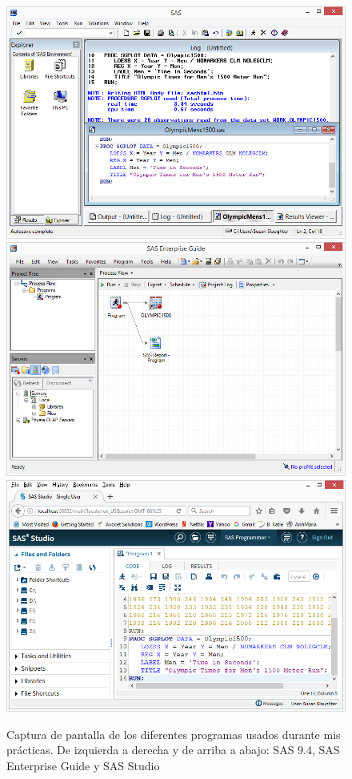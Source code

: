\documentclass[pdftex,11pt,a4paper]{book}
\begin{document}
\begin{figure}
\begin{center}
\includegraphics[scale=0.25]{sas9-4}
\includegraphics[scale=0.25]{sas-enterprise}
\includegraphics[scale=0.25]{sas-studio}
\caption{Captura de pantalla de los diferentes programas usados durante mis prácticas. De izquierda a derecha y de arriba a abajo: SAS 9.4, SAS Enterprise Guide y SAS Studio}
\label{fig:interfazSAS}
\end{center}
\end{figure}
\end{document}
